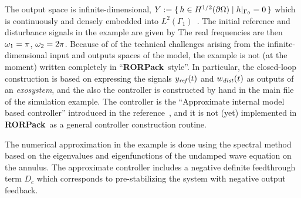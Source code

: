 \documentclass[11pt, a4paper]{amsart}
\theoremstyle{definition}
\numberwithin{equation}{section}
\newcommand{\yref}{y_{\mbox{\scriptsize\textit{ref}}}}
\newcommand{\wdist}{w_{\mbox{\scriptsize\textit{dist}}}}
\newcommand{\RORname}{\textbf{RORPack}}
\begin{document}
  The output space is infinite-dimensional,  $Y :=  \{\,h\in H^{1/2}(\partial\Omega)\mid h\vert_{\Gamma_0}=0\,\}$ which is continuously and densely embedded into $L^2(\Gamma_1)$~. 
The initial reference and disturbance signals in the example are given by
  The real frequencies are then $\omega_1=\pi$, $ \omega_2=2\pi$.
Because of of the technical challenges arising from the infinite-dimensional input and outputs spaces of the model, the example is not (at the moment) written completely in ``\RORname\ style''. In particular, the closed-loop construction is based on expressing the signals $\yref(t)$ and $\wdist(t)$ as outputs of an \emph{exosystem}, and the also the controller is constructed by hand in the main file of the simulation example. The controller is the ``Approximate internal model based controller'' introduced in the reference~\cite{HumKur19}, and it is not (yet) implemented in \RORname\ as a general controller construction routine.

  The numerical approximation in the example is done using the spectral method based on the eigenvalues and eigenfunctions of the undamped wave equation on the annulus. The approximate controller includes a negative definite feedthrough term $D_c$ which corresponds to pre-stabilizing the system with negative output feedback. 
\end{document}
